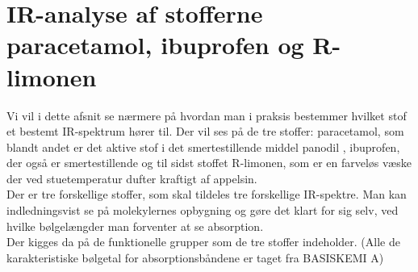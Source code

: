 \section{IR-analyse af stofferne paracetamol, ibuprofen og R-limonen}\label{IRSPEK}
Vi vil i dette afsnit se nærmere på hvordan man i praksis bestemmer hvilket stof et bestemt IR-spektrum hører til. Der vil ses på de tre stoffer: paracetamol, som blandt andet er det aktive stof i det smertestillende middel panodil , ibuprofen, der også er smertestillende og til sidst stoffet R-limonen, som er en farveløs væske der ved stuetemperatur dufter kraftigt af appelsin.     \\
Der er tre forskellige stoffer, som skal tildeles tre forskellige IR-spektre. Man kan indledningsvist se på molekylernes opbygning og gøre det klart for sig selv, ved hvilke bølgelængder man forventer at se absorption. 
\\

Der kigges da på de funktionelle grupper som de tre stoffer indeholder. (Alle de karakteristiske bølgetal for absorptionsbåndene er taget fra BASISKEMI A)

